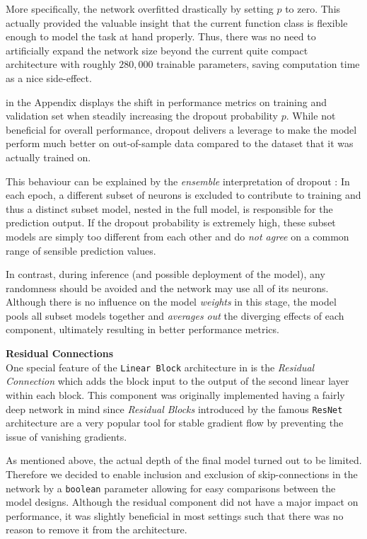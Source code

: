 More specifically, the network overfitted drastically by setting $p$ to zero.
This actually provided the valuable insight that the current function class is flexible enough to model the task at hand properly.
Thus, there was no need to artificially expand the network size beyond the current quite compact architecture with roughly $280,000$ trainable parameters, saving computation time as a nice side-effect.

 in the Appendix displays the shift in performance metrics on training and validation set when steadily increasing the dropout probability $p$.
While not beneficial for overall performance, dropout delivers a leverage to make the model perform much better on out-of-sample data compared to the dataset that it was actually trained on.

This behaviour can be explained by the \emph{ensemble} interpretation of dropout \citep{goodfellow2016}:
In each epoch, a different subset of neurons is excluded to contribute to training and thus a distinct subset model, nested in the full model, is responsible for the prediction output.
If the dropout probability is extremely high, these subset models are simply too different from each other and do \emph{not agree} on a common range of sensible prediction values.

In contrast, during inference (and possible deployment of the model), any randomness should be avoided and the network may use all of its neurons.
Although there is no influence on the model \emph{weights} in this stage, the model pools all subset models together and \emph{averages out} the diverging effects of each component, ultimately resulting in better performance metrics.

\textbf{Residual Connections} \\
One special feature of the \texttt{Linear Block} architecture in  is the \emph{Residual Connection} which adds the block input to the output of the second linear layer within each block.
This component was originally implemented having a fairly deep network in mind since \emph{Residual Blocks} introduced by the famous \texttt{ResNet} architecture \citep{he2015} are a very popular tool for stable gradient flow by preventing the issue of vanishing gradients.

As mentioned above, the actual depth of the final model turned out to be limited.
Therefore we decided to enable inclusion and exclusion of skip-connections in the network by a \texttt{boolean} parameter allowing for easy comparisons between the model designs.
Although the residual component did not have a major impact on performance, it was slightly beneficial in most settings such that there was no reason to remove it from the architecture.

